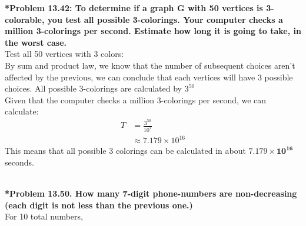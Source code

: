 \documentclass{article}
\begin{document}
    \noindent \textbf{*Problem 13.42: To determine if a graph G with 50 vertices is 3-colorable, you test all possible 3-colorings. Your computer checks a million 3-colorings per second. Estimate how long it is going to take, in the worst case.}
    \\ Test all 50 vertices with 3 colors:
    \\ By sum and product law, we know that the number of subsequent choices aren't affected by the previous, we can conclude that each vertices will have 3 possible choices. All possible 3-colorings are calculated by $3^{50}$
    \\ Given that the computer checks a million 3-colorings per second, we can calculate:
    \begin{align*}
        T &= \frac{3^{50}}{10^7}\\
        & \approx 7.179 \times 10^{16}
    \end{align*}
    \noindent This means that all possible 3 colorings can be calculated in about {\LARGE $\boxed{\mathbf{7.179 \times 10^{16}}}$} seconds.
    
    \noindent\\[0.25in]
    \noindent \textbf{*Problem 13.50. How many 7-digit phone-numbers are non-decreasing (each digit is not less than the previous one.)}
    \\ For 10 total numbers, 
    
\end{document}
